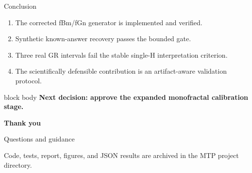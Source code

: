 \documentclass[aspectratio=169,11pt]{beamer}
\begin{document}
\begin{frame}{Conclusion}
\begin{enumerate}
  \item The corrected fBm/fGn generator is implemented and verified.
  \item Synthetic known-answer recovery passes the bounded gate.
  \item Three real GR intervals fail the stable single-H interpretation criterion.
  \item The scientifically defensible contribution is an artifact-aware validation protocol.
\end{enumerate}
\vfill
\begin{beamercolorbox}[sep=0.35cm,wd=\textwidth]{block body}
\centering\Large\bfseries Next decision: approve the expanded monofractal calibration stage.
\end{beamercolorbox}
\end{frame}

\begin{frame}[plain]
\begin{center}
\vfill
{\color{Navy}\fontsize{30}{34}\selectfont\bfseries Thank you}\par
\vspace{0.35cm}
{\color{Teal}\Large Questions and guidance}\par
\vfill
\small
Code, tests, report, figures, and JSON results are archived in the MTP project directory.
\end{center}
\end{frame}
\end{document}
